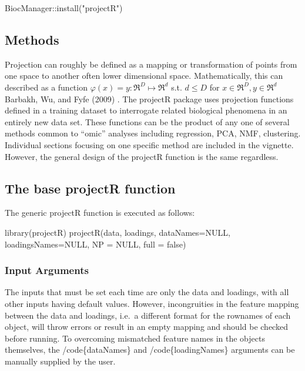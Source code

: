 \documentclass[]{article}
\renewenvironment{verbatim}{\color{codecolor}\begin{myshaded}\begin{oldverbatim}}{\end{oldverbatim}\end{myshaded}}
\begin{document}
\begin{verbatim}
BiocManager::install("projectR")
\end{verbatim}

\hypertarget{methods}{%
\subsection{Methods}\label{methods}}

Projection can roughly be defined as a mapping or transformation of points from one space to another often lower dimensional space. Mathematically, this can described as a function \(\varphi(x)=y : \Re^{D} \mapsto \Re^{d}\) s.t. \(d \leq D\) for \(x \in \Re^{D}, y \in \Re^{d}\) Barbakh, Wu, and Fyfe (2009) . The projectR package uses projection functions defined in a training dataset to interrogate related biological phenomena in an entirely new data set. These functions can be the product of any one of several methods common to ``omic'' analyses including regression, PCA, NMF, clustering. Individual sections focusing on one specific method are included in the vignette. However, the general design of the projectR function is the same regardless.

\hypertarget{the-base-projectr-function}{%
\subsection{The base projectR function}\label{the-base-projectr-function}}

The generic projectR function is executed as follows:

\begin{verbatim}
library(projectR)
projectR(data, loadings, dataNames=NULL, loadingsNames=NULL, NP = NULL, full = false)
\end{verbatim}

\hypertarget{input-arguments}{%
\subsubsection{Input Arguments}\label{input-arguments}}

The inputs that must be set each time are only the data and loadings, with all other inputs having default values. However, incongruities in the feature mapping between the data and loadings, i.e.~a different format for the rownames of each object, will throw errors or result in an empty mapping and should be checked before running. To overcoming mismatched feature names in the objects themselves, the /code\{dataNames\} and /code\{loadingNames\} arguments can be manually supplied by the user.
\end{document}
